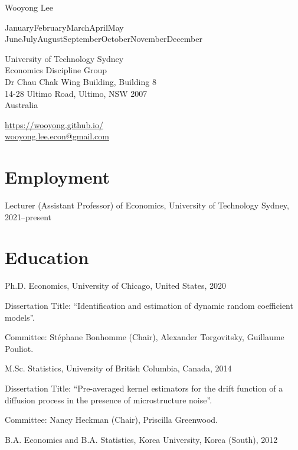\documentclass[10pt,letterpaper]{article}
\def\name{Wooyong Lee}
\newcommand{\titlefont}[1]{{\titleface\large\MakeUppercase{#1}}}
\renewenvironment{itemize}{
  \begin{list}{}{
      \setlength{\leftmargin}{1.5em}
      \setlength{\itemsep}{0.25em}
      \setlength{\parskip}{0pt}
      \setlength{\parsep}{0.25em}
    }
}{
  \end{list}
}
\renewcommand{\today}{\ifcase \month \or January\or February\or March\or April\or May%
\or June\or July\or August\or September\or October\or November\or December\fi%
\space \number \year}
\begin{document}
{\huge \name}


\bigskip
\today

\bigskip
\begin{minipage}[t]{0.495\textwidth}
  University of Technology Sydney \\
  Economics Discipline Group \\
  Dr Chau Chak Wing Building, Building 8 \\
  14-28 Ultimo Road, Ultimo, NSW 2007 \\
  Australia
\end{minipage}
\begin{minipage}[t]{0.495\textwidth}
  \href{https://wooyong.github.io/}{https://wooyong.github.io/} \\
  \href{mailto:wooyong.lee.econ@gmail.com}{wooyong.lee.econ@gmail.com} \\
\end{minipage}

\section*{Employment}

\begin{itemize}
\item Lecturer (Assistant Professor) of Economics, University of Technology Sydney, 2021--present
\end{itemize}

\section*{Education}

\begin{itemize}
  \item Ph.D. Economics, University of Chicago, United States, 2020
    \begin{itemize}
    \item Dissertation Title: ``Identification and estimation of dynamic random coefficient models''.
    \item Committee: St\'ephane Bonhomme (Chair), Alexander Torgovitsky, Guillaume Pouliot.
    \end{itemize}
  \item M.Sc. Statistics, University of British Columbia, Canada, 2014
    \begin{itemize}
    \item Dissertation Title: ``Pre-averaged kernel estimators for the drift function of a diffusion process in the presence of microstructure noise''.
    \item Committee: Nancy Heckman (Chair), Priscilla Greenwood.
    \end{itemize}
  \item B.A. Economics and B.A. Statistics, Korea University, Korea (South), 2012
\end{itemize}
\end{document}
